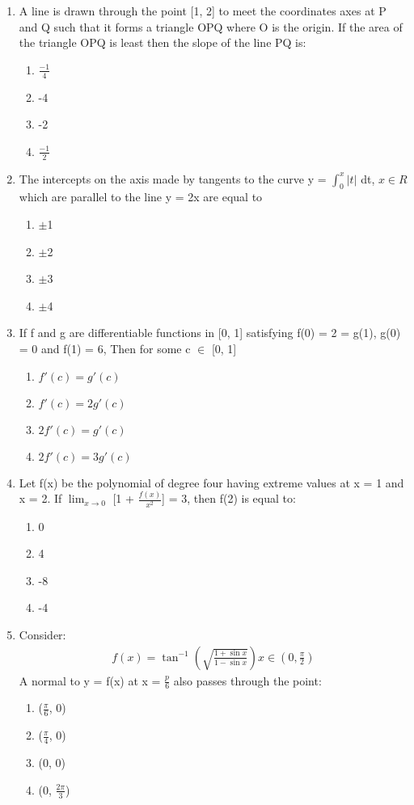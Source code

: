 \begin{enumerate}[label=\arabic*.,ref=\thesubsection.\theenumi]
\item A line is drawn through the point [1, 2] to meet the coordinates axes at P and Q such that it forms a triangle OPQ where O is the origin. If the area of the triangle OPQ is least then the slope of the line PQ is:
\begin{enumerate}
\item $\frac{-1}{4}$
\item -4
\item -2
\item $\frac{-1}{2}$
\end{enumerate}

\item The intercepts on the axis made by tangents to the curve y = $\int_0^x |t|$ dt, $x \in R$ which are parallel to the line y = 2x are equal to 
\begin{enumerate}
\item $\pm$1
\item $\pm$2
\item $\pm$3
\item $\pm$4
\end{enumerate}

\item If f and g are differentiable functions in [0, 1] satisfying f(0) = 2 = g(1), g(0) = 0 and f(1) = 6, Then for some c $\in$ [0, 1]
\begin{enumerate}
\item $f'(c) = g'(c)$
\item $f'(c) = 2g'(c)$
\item $2f'(c) = g'(c)$
\item $2f'(c) = 3g'(c)$
\end{enumerate}

\item Let f(x) be the polynomial of degree four having extreme values at x = 1 and x = 2. If $\lim_{x \to 0}$
[1 + $\frac{f(x)}{x^2}$] = 3, then f(2) is equal to:
\begin{enumerate}
\item 0
\item 4
\item -8
\item -4
\end{enumerate}

\item Consider:
\begin{align*}
f(x) = \tan^{-1}(\sqrt{\frac{1 + \sin x}{1 - \sin x}}) x \in (0, \frac{\pi}{2})
\end{align*} 
A normal to y = f(x) at x = $\frac{p}{6}$ also passes through the point:
\begin{enumerate}
\item ($\frac{\pi}{6}$, 0)
\item ($\frac{\pi}{4}$, 0)
\item (0, 0)
\item (0, $\frac{2\pi}{3}$)
\end{enumerate}


\end{enumerate}
